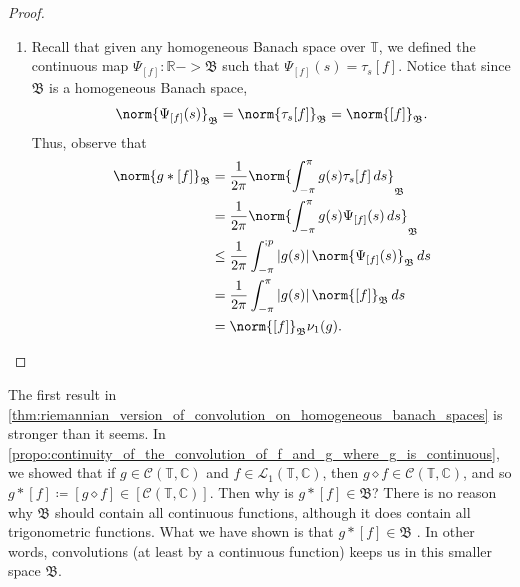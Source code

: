 \documentclass[notoc,notitlepage]{tufte-book}
\begin{document}
\begin{proof}
\begin{enumerate}
    \item Recall that given any homogeneous Banach space over $\mathbb{T}$,
      we defined the continuous map $\Psi_{[f]} : \mathbb{R} -> \mathfrak{B}$
      such that $\Psi_{[f]}(s) = \tau_s[f]$. Notice that
      since $\mathfrak{B}$ is a homogeneous Banach space,
      \begin{equation*}
        \norm{\Psi_{[f]}(s)}_{\mathfrak{B}} = \norm{\tau_s[f]}_{\mathfrak{B}}
        = \norm{[f]}_{\mathfrak{B}}.
      \end{equation*}
      Thus, observe that
      \begin{align*}
        \norm{g * [f]}_{\mathfrak{B}}
        &= \frac{1}{2\pi} \norm{ \int_{-\pi}^{\pi} g(s)\tau_s[f] \dif{s}}_{\mathfrak{B}} \\
        &= \frac{1}{2\pi} \norm{ \int_{-\pi}^{\pi} g(s) \Psi_{[f]}(s) \dif{s} }_{\mathfrak{B}} \\
        &\leq \frac{1}{2\pi} \int_{-\pi}^{;p} \abs{g(s)}
          \norm{\Psi_{[f]}(s)}_{\mathfrak{B}} \dif{s} \\
        &= \frac{1}{2\pi} \int_{-\pi}^{\pi} \abs{g(s)} \norm{[f]}_{\mathfrak{B}} \dif{s} \\
        &= \norm{[f]}_{\mathfrak{B}} \nu_1(g).
      \end{align*}
  \end{enumerate}
\end{proof}

\begin{remark}
  The first result in
  \cref{thm:riemannian_version_of_convolution_on_homogeneous_banach_spaces}
  is stronger than it seems.
  In
  \cref{propo:continuity_of_the_convolution_of_f_and_g_where_g_is_continuous},
  we showed that if $g \in \mathcal{C}(\mathbb{T}, \mathbb{C})$ and
  $f \in \mathcal{L}_1(\mathbb{T}, \mathbb{C})$, then
  $g \diamond f \in \mathcal{C}(\mathbb{T}, \mathbb{C})$, and so
  $g * [f] \coloneqq [g \diamond f] \in [\mathcal{C}(\mathbb{T}, \mathbb{C})]$.
  Then why is $g * [f] \in \mathfrak{B}$?
  There is no reason why $\mathfrak{B}$ should contain all continuous functions,
  although it does contain all trigonometric functions.
  What we have shown is that $g * [f] \in \mathfrak{B}$
  . 
  In other words, convolutions (at least by a continuous function)
  keeps us in this smaller space $\mathfrak{B}$.
\end{remark}

\end{document}

